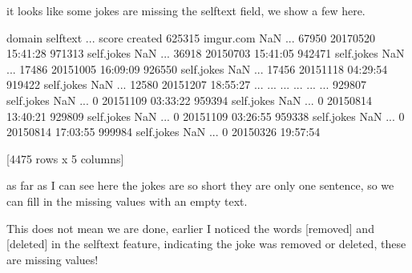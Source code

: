 \documentclass[letterpaper,10pt,english]{jupyterBook}
\begin{document}
\sphinxAtStartPar
it looks like some jokes are missing the selftext field, we show a few here.

\begin{sphinxVerbatim}[commandchars=\\\{\}]
\PYG{p}{[}\PYG{p}{]} 
\end{sphinxVerbatim}

\begin{sphinxVerbatim}[commandchars=\\\{\}]
            domain selftext  ...  score             created
625315   imgur.com      NaN  ...  67950 2017\PYGZhy{}05\PYGZhy{}20 15:41:28
971313  self.jokes      NaN  ...  36918 2015\PYGZhy{}07\PYGZhy{}03 15:41:05
942471  self.jokes      NaN  ...  17486 2015\PYGZhy{}10\PYGZhy{}05 16:09:09
926550  self.jokes      NaN  ...  17456 2015\PYGZhy{}11\PYGZhy{}18 04:29:54
919422  self.jokes      NaN  ...  12580 2015\PYGZhy{}12\PYGZhy{}07 18:55:27
...            ...      ...  ...    ...                 ...
929807  self.jokes      NaN  ...      0 2015\PYGZhy{}11\PYGZhy{}09 03:33:22
959394  self.jokes      NaN  ...      0 2015\PYGZhy{}08\PYGZhy{}14 13:40:21
929809  self.jokes      NaN  ...      0 2015\PYGZhy{}11\PYGZhy{}09 03:26:55
959338  self.jokes      NaN  ...      0 2015\PYGZhy{}08\PYGZhy{}14 17:03:55
999984  self.jokes      NaN  ...      0 2015\PYGZhy{}03\PYGZhy{}26 19:57:54

[4475 rows x 5 columns]
\end{sphinxVerbatim}

\sphinxAtStartPar
as far as I can see here the jokes are so short they are only one sentence, so we can fill in the missing values with an empty text.

\begin{sphinxVerbatim}[commandchars=\\\{\}]
  
\end{sphinxVerbatim}

\sphinxAtStartPar
This does not mean we are done, earlier I noticed the words {[}removed{]} and {[}deleted{]} in the selftext feature, indicating the joke was removed or deleted, these are missing values!
\end{document}
